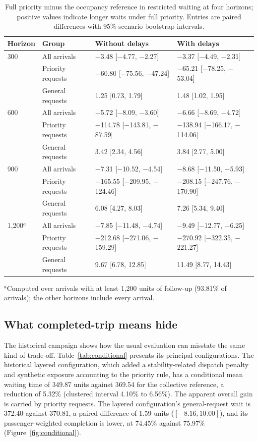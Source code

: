 \begin{table}[htbp]\centering
\caption{Full priority minus the occupancy reference in restricted waiting at four horizons; positive values indicate longer waits under full priority. Entries are paired differences with 95\% scenario-bootstrap intervals.}\label{tab:horizon-sensitivity}
\small\begin{tabular}{@{}llll@{}}
\toprule Horizon & Group & Without delays & With delays\\\midrule
300 & All arrivals & $-$3.48 [$-$4.77, $-$2.27] & $-$3.37 [$-$4.49, $-$2.31]\\
 & Priority requests & $-$60.80 [$-$75.56, $-$47.24] & $-$65.21 [$-$78.25, $-$53.04]\\
 & General requests & 1.25 [0.73, 1.79] & 1.48 [1.02, 1.95]\\
600 & All arrivals & $-$5.72 [$-$8.09, $-$3.60] & $-$6.66 [$-$8.69, $-$4.72]\\
 & Priority requests & $-$114.78 [$-$143.81, $-$87.59] & $-$138.94 [$-$166.17, $-$114.06]\\
 & General requests & 3.42 [2.34, 4.56] & 3.84 [2.77, 5.00]\\
900 & All arrivals & $-$7.31 [$-$10.52, $-$4.54] & $-$8.68 [$-$11.50, $-$5.93]\\
 & Priority requests & $-$165.55 [$-$209.95, $-$124.46] & $-$208.15 [$-$247.76, $-$170.90]\\
 & General requests & 6.08 [4.27, 8.03] & 7.26 [5.34, 9.40]\\
1,200$^{a}$ & All arrivals & $-$7.85 [$-$11.48, $-$4.74] & $-$9.49 [$-$12.77, $-$6.25]\\
 & Priority requests & $-$212.68 [$-$271.06, $-$159.29] & $-$270.92 [$-$322.35, $-$221.27]\\
 & General requests & 9.67 [6.78, 12.85] & 11.49 [8.77, 14.43]\\
\bottomrule
\end{tabular}

\smallskip\parbox{.95\linewidth}{\footnotesize $^{a}$Computed over arrivals with at least 1,200 units of follow-up (93.81\% of arrivals); the other horizons include every arrival.}
\end{table}

\subsection{What completed-trip means hide}\label{sec:historical-results}

The historical campaign shows how the usual evaluation can misstate the same kind of trade-off. Table~\ref{tab:conditional} presents its principal configurations. The historical layered configuration, which added a stability-related dispatch penalty and synthetic exposure accounting to the priority rule, has a conditional mean waiting time of 349.87 units against 369.54 for the collective reference, a reduction of 5.32\% (clustered interval 4.10\% to 6.56\%). The apparent overall gain is carried by priority requests. The layered configuration's general-request wait is 372.40 against 370.81, a paired difference of 1.59 units ($[-8.16, 10.00]$), and its passenger-weighted completion is lower, at 74.45\% against 75.97\% (Figure~\ref{fig:conditional}).

